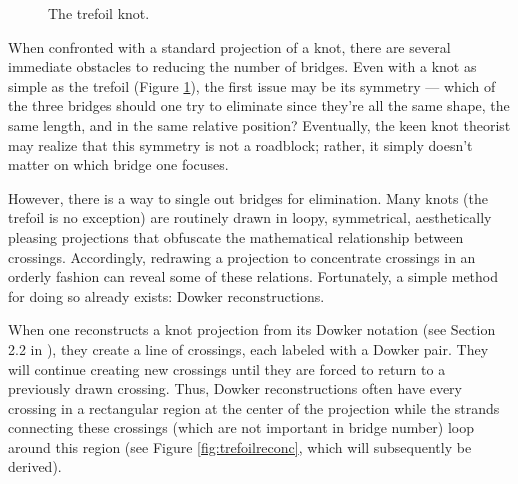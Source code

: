 \documentclass[titlepage]{article}
\begin{document}
\begin{figure}[h!]
    \centering
    \vspace{-2.3em}
    \caption{The trefoil knot.}
    \label{fig:trefoil}
\end{figure}

\noindent When confronted with a standard projection of a knot, there are several immediate obstacles to reducing the number of bridges. Even with a knot as simple as the trefoil (Figure \ref{fig:trefoil}), the first issue may be its symmetry --- which of the three bridges should one try to eliminate since they're all the same shape, the same length, and in the same relative position? Eventually, the keen knot theorist may realize that this symmetry is not a roadblock; rather, it simply doesn't matter on which bridge one focuses.\par
However, there is a way to single out bridges for elimination. Many knots (the trefoil is no exception) are routinely drawn in loopy, symmetrical, aesthetically pleasing projections that obfuscate the mathematical relationship between crossings. Accordingly, redrawing a projection to concentrate crossings in an orderly fashion can reveal some of these relations. Fortunately, a simple method for doing so already exists: Dowker reconstructions.\par
When one reconstructs a knot projection from its Dowker notation (see Section 2.2 in \cite{bib:knotnotes}), they create a line of crossings, each labeled with a Dowker pair. They will continue creating new crossings until they are forced to return to a previously drawn crossing. Thus, Dowker reconstructions often have every crossing in a rectangular region at the center of the projection while the strands connecting these crossings (which are not important in bridge number) loop around this region (see Figure \ref{fig:trefoilreconc}, which will subsequently be derived).\par
\end{document}
